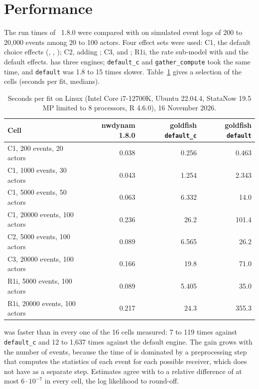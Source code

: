 \section{Performance}\label{sec:speed}

The run times of \nwdynam{}~1.8.0 were compared with \goldfish{} on simulated event logs of 200 to 20,000 events among 20 to 100 actors. Four effect sets were used: C1, the default choice effects (, , ); C2, adding ; C3,  and ; R1i, the rate sub-model with  and the default effects. \goldfish{} has three engines; \texttt{default\_c} and \texttt{gather\_compute} took the same time, and \texttt{default} was 1.8 to 15 times slower. Table~\ref{tab:speed} gives a selection of the cells (seconds per fit, medians).
\begin{table}[ht]
\centering\small
\begin{tabular}{@{}lrrr@{}}
\toprule
Cell & nwdynam 1.8.0 & goldfish \texttt{default\_c} & goldfish \texttt{default}\\
\midrule
C1, 200 events, 20 actors & 0.038 & 0.256 & 0.463\\
C1, 1000 events, 30 actors & 0.043 & 1.254 & 2.343\\
C1, 5000 events, 50 actors & 0.063 & 6.332 & 14.0\\
C1, 20000 events, 100 actors & 0.236 & 26.2 & 101.4\\
C2, 5000 events, 100 actors & 0.089 & 6.565 & 26.2\\
C3, 20000 events, 100 actors & 0.166 & 19.8 & 71.0\\
R1i, 5000 events, 100 actors & 0.089 & 5.405 & 35.0\\
R1i, 20000 events, 100 actors & 0.217 & 24.3 & 355.3\\
\bottomrule
\end{tabular}
\caption{Seconds per fit on Linux (Intel Core i7-12700K, Ubuntu 22.04.4, StataNow 19.5 MP limited to 8 processors, R 4.6.0), 16 November 2026.}\label{tab:speed}
\end{table}
\nwdynam{} was faster than \goldfish{} in every one of the 16 cells measured: 7 to 119 times against \texttt{default\_c} and 12 to 1,637 times against the default engine. The gain grows with the number of events, because the time of \goldfish{} is dominated by a preprocessing step that computes the statistics of each event for each possible receiver, which \nwdynam{} does not have as a separate step. Estimates agree with \goldfish{} to a relative difference of at most $6\cdot10^{-7}$ in every cell, the log likelihood to round-off.

